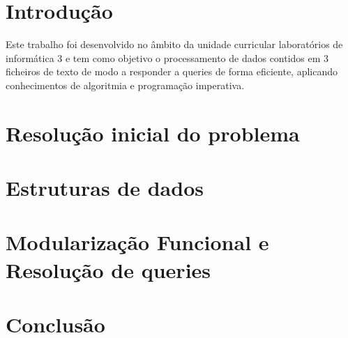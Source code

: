 \documentclass[a4paper]{report} %
\begin{document}
\begin{titlepage}
\begin{center}
\vspace{2.0cm}

\end{center}
\end{titlepage}

\maketitle

\tableofcontents

\listoffigures


\chapter{Introdução}

Este trabalho foi desenvolvido no âmbito da unidade curricular laboratórios de informática 3 e tem como objetivo o processamento de dados contidos em 3 ficheiros de texto de modo a responder a queries de forma eficiente, aplicando conhecimentos de algoritmia e programação imperativa.
  


\chapter{Resolução inicial do problema}





\chapter{Estruturas de dados}

\chapter{Modularização Funcional e Resolução de queries}











\chapter{Conclusão}





   
\end{document}
